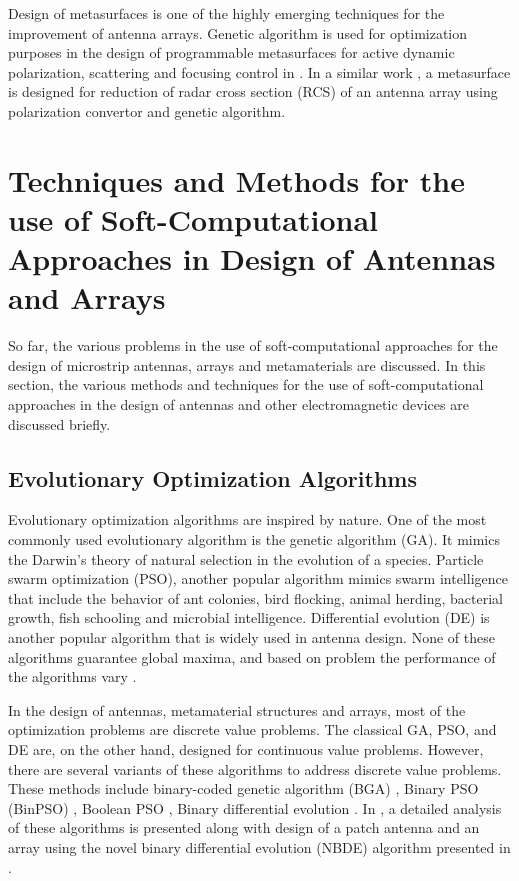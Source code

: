 Design of metasurfaces is one of the highly emerging techniques for the improvement of antenna arrays. Genetic algorithm is used for optimization purposes in the design of programmable metasurfaces for active dynamic polarization, scattering and focusing control in \cite{softCompMeta}. In a similar work \cite{uwb_rcs}, a metasurface is designed for reduction of radar cross section (RCS) of an antenna array using polarization convertor and genetic algorithm.

\section{Techniques and Methods for the use of Soft-Computational Approaches in Design of Antennas and Arrays} \label{c2sec_methods}
So far, the various problems in the use of soft-computational approaches for the design of microstrip antennas, arrays and metamaterials are discussed. In this section, the various methods and techniques for the use of soft-computational approaches in the design of antennas and other electromagnetic devices are discussed briefly.

\subsection{Evolutionary Optimization Algorithms}
Evolutionary optimization algorithms are inspired by nature. One of the most commonly used evolutionary algorithm is the genetic algorithm (GA). It mimics the Darwin's theory of natural selection in the evolution of a species. Particle swarm optimization (PSO), another popular algorithm mimics swarm intelligence that include the behavior of ant colonies, bird flocking, animal herding, bacterial growth, fish schooling and microbial intelligence. Differential evolution (DE) is another popular algorithm that is widely used in antenna design. None of these algorithms guarantee global maxima, and based on problem the performance of the algorithms vary \cite{compCAD4Arry}.

In the design of antennas, metamaterial structures and arrays, most of the optimization problems are discrete value problems. The classical GA, PSO, and DE are, on the other hand, designed for continuous value problems. However, there are several variants of these algorithms to address discrete value problems. These methods include binary-coded genetic algorithm (BGA) \cite{optAlgBGAbook, optAlgEMbook}, Binary PSO (BinPSO) \cite{optAlgBPSO}, Boolean PSO \cite{arraySynth1, OptAlgBoolPSO4Ant}, Binary differential evolution \cite{optAlgBinDE, optAlgModBinDE}. In \cite{optAlgDE4AntennaRev}, a detailed analysis of these algorithms is presented along with design of a patch antenna and an array using the novel binary differential evolution (NBDE) algorithm presented in \cite{optAlgModBinDE}.

